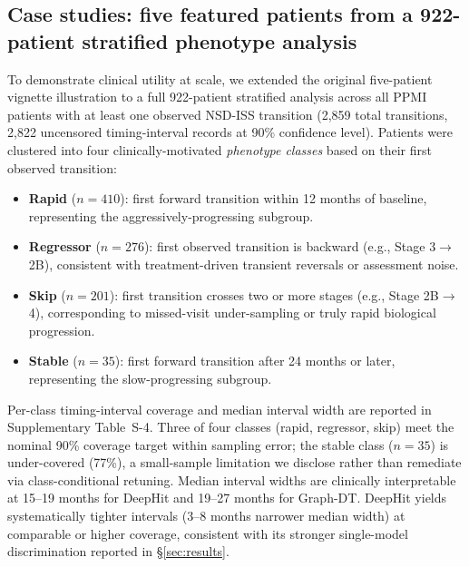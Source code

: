\documentclass[11pt]{article}
\begin{document}
\subsection*{Case studies: five featured patients from a 922-patient stratified phenotype analysis}

To demonstrate clinical utility at scale, we extended the original five-patient vignette illustration to a full 922-patient stratified analysis across all PPMI patients with at least one observed NSD-ISS transition (2{,}859 total transitions, 2{,}822 uncensored timing-interval records at 90\% confidence level). Patients were clustered into four clinically-motivated \emph{phenotype classes} based on their first observed transition:

\begin{itemize}
\item \textbf{Rapid} ($n = 410$): first forward transition within 12 months of baseline, representing the aggressively-progressing subgroup.
\item \textbf{Regressor} ($n = 276$): first observed transition is backward (e.g., Stage 3$\to$2B), consistent with treatment-driven transient reversals or assessment noise.
\item \textbf{Skip} ($n = 201$): first transition crosses two or more stages (e.g., Stage 2B$\to$4), corresponding to missed-visit under-sampling or truly rapid biological progression.
\item \textbf{Stable} ($n = 35$): first forward transition after 24 months or later, representing the slow-progressing subgroup.
\end{itemize}

Per-class timing-interval coverage and median interval width are reported in Supplementary Table~S-4. Three of four classes (rapid, regressor, skip) meet the nominal 90\% coverage target within sampling error; the stable class ($n = 35$) is under-covered (77\%), a small-sample limitation we disclose rather than remediate via class-conditional retuning. Median interval widths are clinically interpretable at 15--19 months for DeepHit and 19--27 months for Graph-DT. DeepHit yields systematically tighter intervals (3--8 months narrower median width) at comparable or higher coverage, consistent with its stronger single-model discrimination reported in \S\ref{sec:results}.
\end{document}
